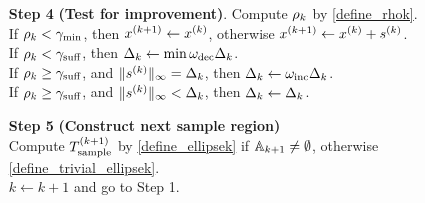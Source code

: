 \begin{algorithm}[H]
\begin{itemize}
        \item[\textbf{Step 4}] \textbf{(Test for improvement)}.
        	Compute $\rho_k$ by \cref{define_rhok}. \\
			If $\rho_k < \gamma_{\textrm{min}}$, then ${{x}^{(k+1)}} \gets x^{(k)}$, otherwise ${{x}^{(k+1)}} \gets x^{(k)} + {{s}^{(k)}}$. \\
            If $\rho_k < \gamma_{\textrm{suff}}$, then $\Delta_k \gets \min\omega_{\text{dec}}\Delta_k$. \\
            If $\rho_k \ge \gamma_{\textrm{suff}}$, and $\|{{s}^{(k)}}\|_{\infty} = \Delta_k$, then $\Delta_k \gets \omega_{\text{inc}}\Delta_k$. \\
            If $\rho_k \ge \gamma_{\textrm{suff}}$, and $\|{{s}^{(k)}}\|_{\infty} < \Delta_k$, then $\Delta_k \gets \Delta_k$.
            
		
        \item[\textbf{Step 5}] \textbf{(Construct next sample region)} \\
        	Compute ${T_{\text{sample}}^{(k+1)}}$ by \cref{define_ellipsek} if ${\mathbb A_{k+1}} \ne \emptyset$, otherwise \cref{define_trivial_ellipsek}. \\
            $k \gets k+1$ and go to Step 1.
            
% 		
% 		
    \end{itemize}
\end{algorithm}

% 
% 
% 
% 

